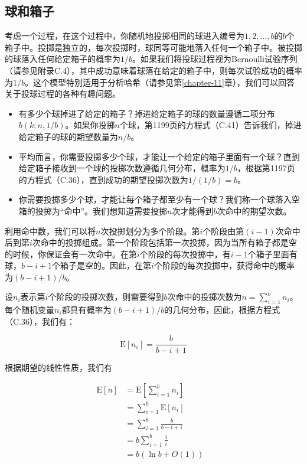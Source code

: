 \documentclass[lang=cn,newtx,10pt,scheme=chinese]{elegantbook}
\begin{document}
\subsection{球和箱子}

考虑一个过程，在这个过程中，你随机地投掷相同的球进入编号为$1,2,\ldots,b$的$ b $个箱子中。投掷是独立的，每次投掷时，球同等可能地落入任何一个箱子中。被投掷的球落入任何给定箱子的概率为$1/b$。如果我们将投球过程视为Bernoulli试验序列（请参见附录C.4），其中成功意味着球落在给定的箱子中，则每次试验成功的概率为$1/b$。这个模型特别适用于分析哈希（请参见第\ref{chapter-11}章），我们可以回答关于投球过程的各种有趣问题。

\begin{itemize}
\item 有多少个球掉进了给定的箱子？掉进给定箱子的球的数量遵循二项分布$b(k;n,1/b)$。如果你投掷$n$个球，第1199页的方程式（C.41）告诉我们，掉进给定箱子的球的期望数量为$n/b$。
\item 平均而言，你需要投掷多少个球，才能让一个给定的箱子里面有一个球？直到给定箱子接收到一个球的投掷次数遵循几何分布，概率为$1/b$，根据第1197页的方程式（C.36），直到成功的期望投掷次数为$1/(1/b)=b$。
\item 你需要投掷多少个球，才能让每个箱子都至少有一个球？我们称一个球落入空箱的投掷为“命中”。我们想知道需要投掷$n$次才能得到$b$次命中的期望次数。
\end{itemize}

利用命中数，我们可以将$n$次投掷划分为多个阶段。第$i$个阶段由第$(i-1)$次命中后到第$i$次命中的投掷组成。第一个阶段包括第一次投掷，因为当所有箱子都是空的时候，你保证会有一次命中。在第$i$个阶段的每次投掷中，有$i-1$个箱子里面有球，$b-i+1$个箱子是空的。因此，在第$i$个阶段的每次投掷中，获得命中的概率为$(b-i+1)/b$。

设$n_i$表示第$i$个阶段的投掷次数，则需要得到$b$次命中的投掷次数为$n=\sum_{i=1}^b n_i$。每个随机变量$n_i$都具有概率为$(b-i+1)/b$的几何分布，因此，根据方程式（C.36），我们有：

$$
\mathrm{E}[n_i]=\frac{b}{b-i+1}
$$

根据期望的线性性质，我们有

$$
\begin{array}{rlr}
\mathrm{E}[n] & =\mathrm{E}[\sum_{i=1}^b n_i] \\
& =\sum_{i=1}^b \mathrm{E}[n_i] & \\
& =\sum_{i=1}^b \frac{b}{b-i+1} & \\
& =b \sum_{i=1}^b \frac{1}{i} & \\
& =b(\ln b+O(1)) &
\end{array}
$$
\end{document}
